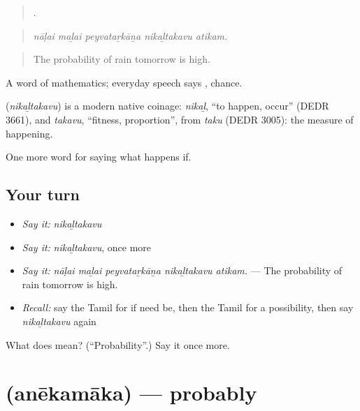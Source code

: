 \begin{quote}
    .
\end{quote}

\begin{quote}
\emph{nāḷai maḻai peyvataṟkāṉa nikaḻtakavu atikam.}
\end{quote}

\begin{quote}
The probability of rain tomorrow is high.
\end{quote}

A word of mathematics; everyday speech says , chance.

\begin{cousinweb}
\textbf{} (\emph{nikaḻtakavu}) is a modern native coinage: \emph{nikaḻ}, \textquotedblleft{}to happen, occur\textquotedblright{} (DEDR 3661), and \emph{takavu}, \textquotedblleft{}fitness, proportion\textquotedblright{}, from \emph{taku} (DEDR 3005): the measure of happening.
\end{cousinweb}

\begin{grammarlens}[title={What you've built}]
One more word for saying what happens if.
\end{grammarlens}

\subsection*{Your turn}
\begin{itemize}
\raggedright
  \item \emph{Say it:} \emph{nikaḻtakavu}
  \item \emph{Say it:} \emph{nikaḻtakavu}, once more
  \item \emph{Say it:} \emph{nāḷai maḻai peyvataṟkāṉa nikaḻtakavu atikam.} — The probability of rain tomorrow is high.
  \item \emph{Recall:} say the Tamil for if need be, then the Tamil for a possibility, then say \emph{nikaḻtakavu} again
\end{itemize}

\begin{tcolorbox}[breakable,colback=teal!4,colframe=teal!35!black,title={Before you move on}]
What does  mean? (\textquotedblleft{}Probability\textquotedblright{}.) Say it once more.
\end{tcolorbox}
\section[\texorpdfstring{\ta{அநேகமாக} (anēkamāka)}{அநேகமாக (anēkamāka)}]{ (anēkamāka) — probably}


